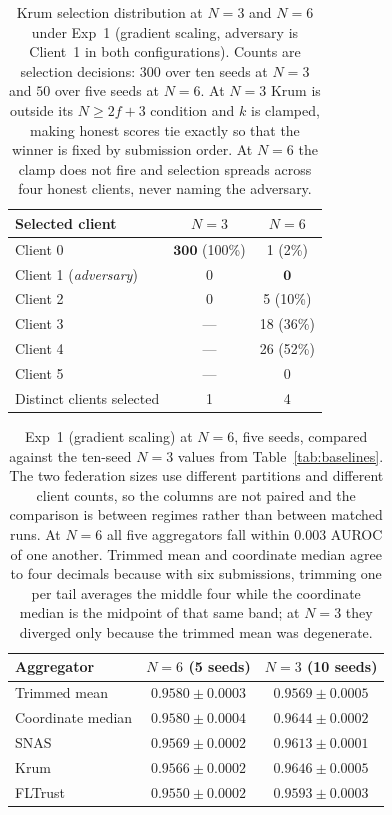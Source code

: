\documentclass[pdflatex,sn-mathphys-num]{sn-jnl}
\begin{document}
\begin{table}[htbp]
\caption{Krum selection distribution at $N=3$ and $N=6$ under Exp~1 (gradient scaling, adversary is Client~1 in both configurations). Counts are selection decisions: $300$ over ten seeds at $N=3$ and $50$ over five seeds at $N=6$. At $N=3$ Krum is outside its $N\geq2f+3$ condition and $k$ is clamped, making honest scores tie exactly so that the winner is fixed by submission order. At $N=6$ the clamp does not fire and selection spreads across four honest clients, never naming the adversary.}
\label{tab:n6-krum}
\centering
\begin{tabular}{lcc}
\toprule
Selected client & $N=3$ & $N=6$ \\
\midrule
Client 0                 & $\mathbf{300}$ (100\%) & 1 (2\%) \\
Client 1 (\emph{adversary}) & 0 & $\mathbf{0}$ \\
Client 2                 & 0 & 5 (10\%) \\
Client 3                 & --- & 18 (36\%) \\
Client 4                 & --- & 26 (52\%) \\
Client 5                 & --- & 0 \\
\midrule
Distinct clients selected & 1 & 4 \\
\bottomrule
\end{tabular}
\end{table}

\begin{table}[htbp]
\caption{Exp~1 (gradient scaling) at $N=6$, five seeds, compared against the ten-seed $N=3$ values from Table~\ref{tab:baselines}. The two federation sizes use different partitions and different client counts, so the columns are not paired and the comparison is between regimes rather than between matched runs. At $N=6$ all five aggregators fall within $0.003$ AUROC of one another. Trimmed mean and coordinate median agree to four decimals because with six submissions, trimming one per tail averages the middle four while the coordinate median is the midpoint of that same band; at $N=3$ they diverged only because the trimmed mean was degenerate.}
\label{tab:n6-auroc}
\centering
\begin{tabular}{lcc}
\toprule
Aggregator & $N=6$ (5 seeds) & $N=3$ (10 seeds) \\
\midrule
Trimmed mean      & $0.9580 \pm 0.0003$ & $0.9569 \pm 0.0005$ \\
Coordinate median & $0.9580 \pm 0.0004$ & $0.9644 \pm 0.0002$ \\
SNAS              & $0.9569 \pm 0.0002$ & $0.9613 \pm 0.0001$ \\
Krum              & $0.9566 \pm 0.0002$ & $0.9646 \pm 0.0005$ \\
FLTrust           & $0.9550 \pm 0.0002$ & $0.9593 \pm 0.0003$ \\
\bottomrule
\end{tabular}
\end{table}
\end{document}
